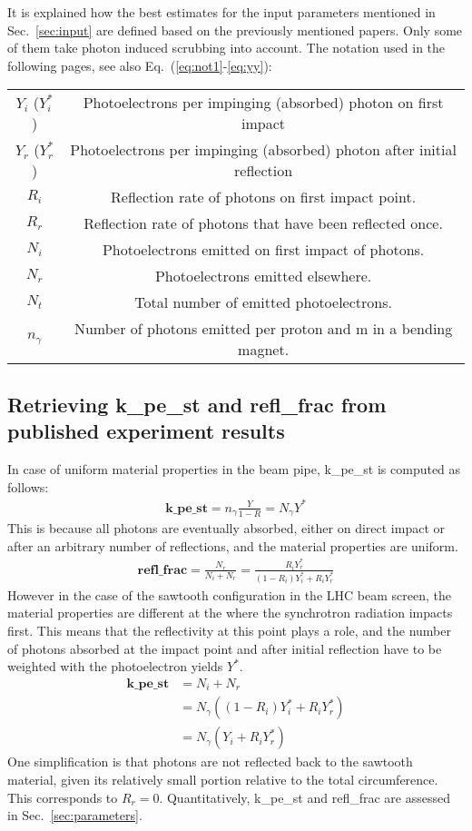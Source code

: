
It is explained how the best estimates for the input parameters mentioned in Sec.~\ref{sec:input} are defined based on the previously mentioned papers.
Only some of them take photon induced scrubbing into account.
The notation used in the following pages, see also Eq.~(\ref{eq:not1}-\ref{eq:yy}):
\begin{center}
    \begin{tabular}{cc}
        $Y_i$ ($Y_i^*$) & Photoelectrons per impinging (absorbed) photon on first impact \\
        $Y_r$ ($Y_r^*$)& Photoelectrons per impinging (absorbed) photon after initial reflection \\
        $R_i$ & Reflection rate of photons on first impact point. \\
        $R_r$ & Reflection rate of photons that have been reflected once. \\
        $N_i$ & Photoelectrons emitted on first impact of photons. \\
        $N_r$ & Photoelectrons emitted elsewhere. \\
        $N_t$ & Total number of emitted photoelectrons.\\
        $n_\gamma$ & Number of photons emitted per proton and m in a bending magnet.
    \end{tabular}
\end{center}


\subsection{Retrieving k\_pe\_st and refl\_frac from published experiment results}

In case of uniform material properties in the beam pipe, k\_pe\_st is computed as follows:
\begin{align}
    \textbf{k\_pe\_st} = n_\gamma \frac{Y}{1-R} = N_\gamma Y^*
\end{align}
This is because all photons are eventually absorbed, either on direct impact or after an arbitrary number of reflections, and the material properties are uniform.
\begin{align}
    \textbf{refl\_frac} = \frac{N_r}{N_i+N_r} = \frac{R_iY^*_r}{(1-R_i)Y_i^* + R_iY^*_r}
\end{align}
However in the case of the sawtooth configuration in the LHC beam screen, the material properties are different at the where the synchrotron radiation impacts first.
This means that the reflectivity at this point plays a role, and the number of photons absorbed at the impact point and after initial reflection have to be weighted with the photoelectron yields $Y^*$.
\begin{align}
    \textbf{k\_pe\_st} &= N_i + N_r
    \\
    &= N_\gamma \left( (1-R_i)Y_i^* + R_iY^*_r \right)
    \\
    &= N_\gamma \left( Y_i + R_iY^*_r \right)
    \label{eq:parts}
\end{align}
One simplification is that photons are not reflected back to the sawtooth material, given its relatively small portion relative to the total circumference.
This corresponds to $R_r=0$.
Quantitatively, k\_pe\_st and refl\_frac are assessed in Sec.~\ref{sec:parameters}.

